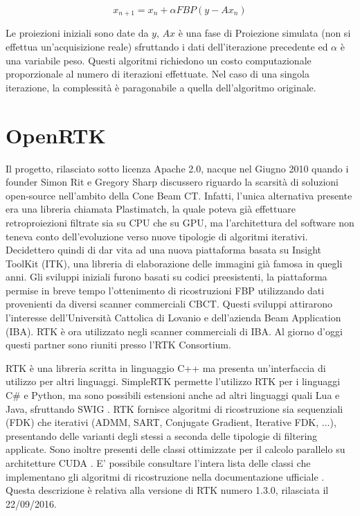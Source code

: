 \documentclass[a4paper,12pt, doubleside]{report}
\begin{document}
                   \begin{equation}
                        x_{n+1} = x_n + \alpha FBP( y - Ax_n)
                    \end{equation}
                    
                    Le proiezioni iniziali sono date da $y$, $Ax$ è una fase di Proiezione simulata (non si effettua un'acquisizione reale) sfruttando i dati dell'iterazione precedente ed $\alpha$ è una variabile peso. Questi algoritmi richiedono un costo computazionale proporzionale al numero di iterazioni effettuate. Nel caso di una singola iterazione, la complessità è paragonabile a quella dell'algoritmo originale.
                    
        \section{OpenRTK}
            \par
                Il progetto, rilasciato sotto licenza Apache 2.0, nacque nel Giugno 2010 quando i founder Simon Rit e Gregory Sharp discussero riguardo la scarsità di soluzioni open-source nell'ambito della Cone Beam CT. Infatti, l'unica alternativa presente era una libreria chiamata Plastimatch, la quale poteva già effettuare retroproiezioni filtrate sia su CPU che su GPU, ma l'architettura del software non teneva conto dell'evoluzione verso nuove tipologie di algoritmi iterativi. Decidettero quindi di dar vita ad una nuova piattaforma basata su Insight ToolKit (ITK), una libreria di elaborazione delle immagini già famosa in quegli anni. Gli sviluppi iniziali furono basati su codici preesistenti, la piattaforma permise in breve tempo l'ottenimento di ricostruzioni FBP utilizzando dati provenienti da diversi scanner commerciali CBCT. Questi sviluppi attirarono l'interesse dell'Università Cattolica di Lovanio e dell'azienda Beam Application (IBA). RTK è ora utilizzato negli scanner commerciali di IBA. Al giorno d'oggi questi partner sono riuniti presso l'RTK Consortium.
            
            \bigskip
            \par
                RTK è una libreria scritta in linguaggio C++ ma presenta un'interfaccia di utilizzo per altri linguaggi. SimpleRTK \cite{simplertk-wiki} permette l'utilizzo RTK per i linguaggi C\# e Python, ma sono possibili estensioni anche ad altri linguaggi quali Lua e Java, sfruttando SWIG \cite{swig-website}.  RTK fornisce algoritmi di ricostruzione sia sequenziali (FDK) che iterativi (ADMM, SART, Conjugate Gradient, Iterative FDK, ...), presentando delle varianti degli stessi a seconda delle tipologie di filtering applicate. Sono inoltre presenti delle classi ottimizzate per il calcolo parallelo su architetture CUDA \cite{cuda}. E' possibile consultare l'intera lista delle classi che implementano gli algoritmi di ricostruzione nella documentazione ufficiale \cite{rtk-classi}. 
                Questa descrizione è relativa alla versione di RTK numero 1.3.0, rilasciata il 22/09/2016.
                    
\end{document}
